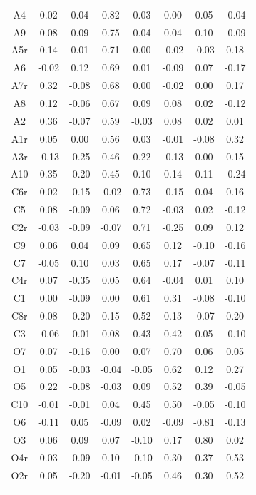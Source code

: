 \documentclass[
  english,
  man]{apa6}
\begin{document}
\begin{table}[tbp]
\begin{center}
\begin{threeparttable}
{\begin{tabular}{cccccccc}
A4 & 0.02 & 0.04 & 0.82 & 0.03 & 0.00 & 0.05 & -0.04\\
A9 & 0.08 & 0.09 & 0.75 & 0.04 & 0.04 & 0.10 & -0.09\\
A5r & 0.14 & 0.01 & 0.71 & 0.00 & -0.02 & -0.03 & 0.18\\
A6 & -0.02 & 0.12 & 0.69 & 0.01 & -0.09 & 0.07 & -0.17\\
A7r & 0.32 & -0.08 & 0.68 & 0.00 & -0.02 & 0.00 & 0.17\\
A8 & 0.12 & -0.06 & 0.67 & 0.09 & 0.08 & 0.02 & -0.12\\
A2 & 0.36 & -0.07 & 0.59 & -0.03 & 0.08 & 0.02 & 0.01\\
A1r & 0.05 & 0.00 & 0.56 & 0.03 & -0.01 & -0.08 & 0.32\\
A3r & -0.13 & -0.25 & 0.46 & 0.22 & -0.13 & 0.00 & 0.15\\
A10 & 0.35 & -0.20 & 0.45 & 0.10 & 0.14 & 0.11 & -0.24\\
C6r & 0.02 & -0.15 & -0.02 & 0.73 & -0.15 & 0.04 & 0.16\\
C5 & 0.08 & -0.09 & 0.06 & 0.72 & -0.03 & 0.02 & -0.12\\
C2r & -0.03 & -0.09 & -0.07 & 0.71 & -0.25 & 0.09 & 0.12\\
C9 & 0.06 & 0.04 & 0.09 & 0.65 & 0.12 & -0.10 & -0.16\\
C7 & -0.05 & 0.10 & 0.03 & 0.65 & 0.17 & -0.07 & -0.11\\
C4r & 0.07 & -0.35 & 0.05 & 0.64 & -0.04 & 0.01 & 0.10\\
C1 & 0.00 & -0.09 & 0.00 & 0.61 & 0.31 & -0.08 & -0.10\\
C8r & 0.08 & -0.20 & 0.15 & 0.52 & 0.13 & -0.07 & 0.20\\
C3 & -0.06 & -0.01 & 0.08 & 0.43 & 0.42 & 0.05 & -0.10\\
O7 & 0.07 & -0.16 & 0.00 & 0.07 & 0.70 & 0.06 & 0.05\\
O1 & 0.05 & -0.03 & -0.04 & -0.05 & 0.62 & 0.12 & 0.27\\
O5 & 0.22 & -0.08 & -0.03 & 0.09 & 0.52 & 0.39 & -0.05\\
C10 & -0.01 & -0.01 & 0.04 & 0.45 & 0.50 & -0.05 & -0.10\\
O6 & -0.11 & 0.05 & -0.09 & 0.02 & -0.09 & -0.81 & -0.13\\
O3 & 0.06 & 0.09 & 0.07 & -0.10 & 0.17 & 0.80 & 0.02\\
O4r & 0.03 & -0.09 & 0.10 & -0.10 & 0.30 & 0.37 & 0.53\\
O2r & 0.05 & -0.20 & -0.01 & -0.05 & 0.46 & 0.30 & 0.52\\
\bottomrule
\addlinespace
\end{tabular}

}
\end{threeparttable}
\end{center}
\end{table}
\end{document}
